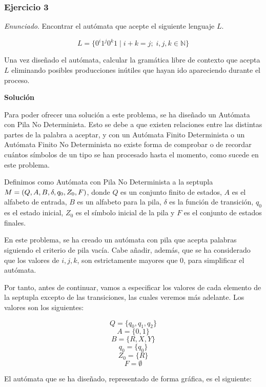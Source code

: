 \documentclass[11pt,a4paper]{article}
\newcommand{\enu}{\textit{Enunciado}}
\newcommand{\sol}{\textbf{Solución}}
\begin{document}
		\subsubsection{Ejercicio 3}
		\enu. Encontrar el autómata que acepte el siguiente lenguaje $L$.
		
		\[L = \lbrace 0^i 1^j 0^k 1 \; | \; i + k = j; \; i, j, k \in \mathbb{N} \rbrace\]
		
		Una vez diseñado el autómata, calcular la gramática libre de contexto que acepta $L$ eliminando posibles producciones
		inútiles que hayan ido apareciendo durante el proceso. \par
		
		\sol \par
		
		Para poder ofrecer una solución a este problema, se ha diseñado un Autómata con Pila No Determinista. Esto se
		debe a que existen relaciones entre las distintas partes de la palabra a aceptar, y con un Autómata Finito
		Determinista o un Autómata Finito No Determinista no existe forma de comprobar o de recordar cuántos símbolos de
		un tipo se han procesado hasta el momento, como sucede en este problema. \par
		
		Definimos como Autómata con Pila No Determinista a la septupla $M = (Q, A, B, \delta, \\q_0, Z_0, F)$, donde $Q$ es un
		conjunto finito de estados, $A$ es el alfabeto de entrada, $B$ es un alfabeto para la pila, $\delta$ es la función
		de transición, $q_0$ es el estado inicial, $Z_0$ es el símbolo inicial de la pila y $F$ es el conjunto de estados
		finales. \par
		
		En este problema, se ha creado un autómata con pila que acepta palabras siguiendo el criterio de pila vacía. 
		Cabe añadir, además, que se ha considerado que los valores de $i, j, k$, son estrictamente mayores que 0, para
		simplificar el autómata. \par
		
		Por tanto, antes de continuar, vamos a especificar los valores de cada elemento de la septupla excepto de las
		transiciones, las cuales veremos más adelante.  Los valores son los siguientes:
		
		\[Q = \{ q_0, q_1, q_2 \} \]
		\[A = \{ 0, 1 \} \]
		\[B = \{ R, X, Y \} \]
		\[q_0 = \{ q_0 \} \]
		\[Z_0 = \{ R \} \]
		\[F = \emptyset \]
		
		El autómata que se ha diseñado, representado de forma gráfica, es el siguiente:
		
\end{document}
